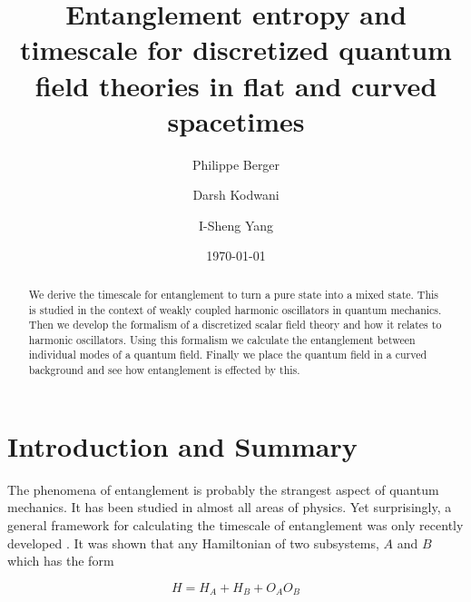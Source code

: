 \documentclass[aps,showpacs,onecolumn,floats,prd,superscriptaddress,nofootinbib]{revtex4-1}
\begin{document}
\title{\textbf{Entanglement entropy and timescale for discretized quantum field theories in flat and curved spacetimes}}

\author{Philippe Berger}
%
\author{Darsh Kodwani}
%
\author{I-Sheng Yang}
%

\date{\today}%

\begin{abstract}
We derive the timescale for entanglement to turn a pure state into a mixed state.
This is studied in the context of weakly coupled harmonic oscillators in quantum mechanics. 
Then we develop the formalism of a discretized scalar field theory and how it relates to harmonic oscillators. 
Using this formalism we calculate the entanglement between individual modes of a quantum field. 
Finally we place the quantum field in a curved background and see how entanglement is effected by this.

\end{abstract}

\maketitle

\section{Introduction and Summary}

The phenomena of entanglement is probably the strangest aspect of quantum mechanics. 
It has been studied in almost all areas of physics. 
Yet surprisingly, a general framework for calculating the timescale of entanglement was only recently developed \cite{Yang:2017llj}. 
It was shown that any Hamiltonian of two subsystems, $A$ and $B$ which has the form

\begin{equation}
	H = H_A + H_B + O_AO_B
\end{equation}
\end{document}
